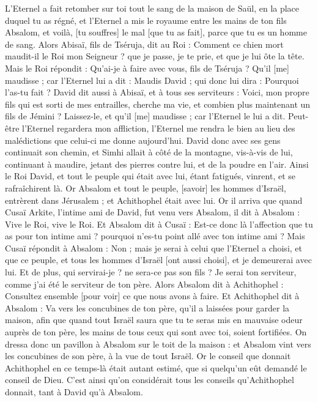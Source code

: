 \begin{multicols}{2}
L'Eternel a fait retomber sur toi tout le sang de la maison de Saül, en la place duquel tu as régné, et l'Eternel a mis le royaume entre les mains de ton fils Absalom, et voilà, [tu souffres] le mal [que tu as fait], parce que tu es un homme de sang.
Alors Abisaï, fils de Tséruja, dit au Roi : Comment ce chien mort maudit-il le Roi mon Seigneur ? que je passe, je te prie, et que je lui ôte la tête.
Mais le Roi répondit : Qu'ai-je à faire avec vous, fils de Tséruja ? Qu'il [me] maudisse ; car l'Eternel lui a dit : Maudis David ; qui donc lui dira : Pourquoi l'as-tu fait ?
David dit aussi à Abisaï, et à tous ses serviteurs : Voici, mon propre fils qui est sorti de mes entrailles, cherche ma vie, et combien plus maintenant un fils de Jémini ? Laissez-le, et qu'il [me] maudisse ; car l'Eternel le lui a dit.
Peut-être l'Eternel regardera mon affliction, l'Eternel me rendra le bien au lieu des malédictions que celui-ci me donne aujourd'hui.
David donc avec ses gens continuait son chemin, et Simhi allait à côté de la montagne, vis-à-vis de lui, continuant à maudire, jetant des pierres contre lui, et de la poudre en l'air.
Ainsi le Roi David, et tout le peuple qui était avec lui, étant fatigués, vinrent, et se rafraîchirent là.
Or Absalom et tout le peuple, [savoir] les hommes d'Israël, entrèrent dans Jérusalem ; et Achithophel était avec lui.
Or il arriva que quand Cusaï Arkite, l'intime ami de David, fut venu vers Absalom, il dit à Absalom : Vive le Roi, vive le Roi.
Et Absalom dit à Cusaï : Est-ce donc là l'affection que tu as pour ton intime ami ? pourquoi n'es-tu point allé avec ton intime ami ?
Mais Cusaï répondit à Absalom : Non ; mais je serai à celui que l'Eternel a choisi, et que ce peuple, et tous les hommes d'Israël [ont aussi choisi], et je demeurerai avec lui.
Et de plus, qui servirai-je ? ne sera-ce pas son fils ? Je serai ton serviteur, comme j'ai été le serviteur de ton père.
Alors Absalom dit à Achithophel : Consultez ensemble [pour voir] ce que nous avons à faire.
Et Achithophel dit à Absalom : Va vers les concubines de ton père, qu'il a laissées pour garder la maison, afin que quand tout Israël saura que tu te seras mis en mauvaise odeur auprès de ton père, les mains de tous ceux qui sont avec toi, soient fortifiées.
On dressa donc un pavillon à Absalom sur le toit de la maison : et Absalom vint vers les concubines de son père, à la vue de tout Israël.
Or le conseil que donnait Achithophel en ce temps-là était autant estimé, que si quelqu'un eût demandé le conseil de Dieu. C'est ainsi qu'on considérait tous les conseils qu'Achithophel donnait, tant à David qu'à Absalom.

\end{multicols}
